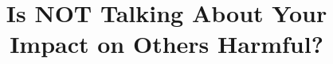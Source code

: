 \documentclass{sig-alternate}
\begin{document}
%

\title{Is NOT Talking About Your Impact on Others Harmful?}

%
%
%
%
%
\end{document}
